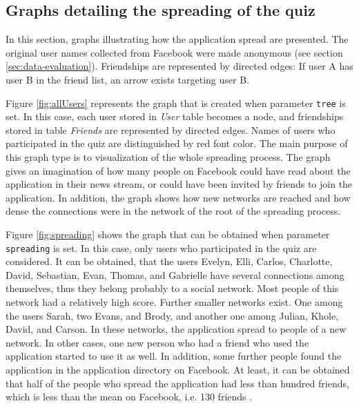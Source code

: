 \documentclass[preprint,12pt]{elsarticle}
\begin{document}
\subsection{Graphs detailing the spreading of the quiz}
\label{sec:distribution-quiz}
In this section, graphs illustrating how the
application spread  are presented. The original user names collected
from Facebook were made anonymous
 (see section \ref{sec:data-evaluation}). Friendships are
represented by directed edges: If user A has user B in the friend list, an
arrow exists targeting user B.

Figure \ref{fig:allUsers} represents the graph that is created when
parameter \verb|tree| is set. In this case, each user stored in \textit{User}
table becomes a node, and friendships stored in table \textit{Friends}
are represented by directed edges. Names of users who participated in the quiz are distinguished by
red font color. The main purpose of this graph type is to
visualization of the whole spreading process.
The graph gives an imagination of how many 
people on Facebook could have read about the application in their 
news stream, or could have been invited by friends to join the
application. In addition, the graph shows how new networks are
reached and how dense the connections were in the network of the root
of the spreading process.


Figure \ref{fig:spreading} shows the graph that can be obtained when
parameter \verb|spreading| is set. In this case, only users who
participated in the quiz are considered. It can be obtained, that the
users Evelyn, Elli, Carlos, Charlotte, David, Sebastian,
Evan, Thomas, and Gabrielle have several connections among themselves,
thus they belong probably to a social network. Most people of this
network had a relatively high score. 
Further smaller networks exist. One among the users Sarah, two Evans,
and Brody, and another one among Julian, Khole, David, and Carson. In
these networks, the application spread to people of a new network. In
other cases, one new person who had a friend who used the application
started to use it as well. In
addition, some further people found the application in the application
directory on Facebook.
At least, it can be obtained that half of the people who spread the application
had less than hundred friends, which is less than the mean on
Facebook, i.e. 130 friends \cite{facebookStats}.

\end{document}
